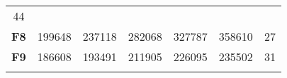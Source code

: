 \documentclass[12pt,a4paper]{article}
\begin{document}
\begin{longtable}[c]{@{}crrrrrr@{}}
\begin{minipage}[t]{0.07\columnwidth}\raggedleft\strut
44
\strut\end{minipage}\tabularnewline
\begin{minipage}[t]{0.11\columnwidth}\centering\strut
\textbf{F8}
\strut\end{minipage} &
\begin{minipage}[t]{0.08\columnwidth}\raggedleft\strut
199648
\strut\end{minipage} &
\begin{minipage}[t]{0.08\columnwidth}\raggedleft\strut
237118
\strut\end{minipage} &
\begin{minipage}[t]{0.09\columnwidth}\raggedleft\strut
282068
\strut\end{minipage} &
\begin{minipage}[t]{0.10\columnwidth}\raggedleft\strut
327787
\strut\end{minipage} &
\begin{minipage}[t]{0.11\columnwidth}\raggedleft\strut
358610
\strut\end{minipage} &
\begin{minipage}[t]{0.07\columnwidth}\raggedleft\strut
27
\strut\end{minipage}\tabularnewline
\begin{minipage}[t]{0.11\columnwidth}\centering\strut
\textbf{F9}
\strut\end{minipage} &
\begin{minipage}[t]{0.08\columnwidth}\raggedleft\strut
186608
\strut\end{minipage} &
\begin{minipage}[t]{0.08\columnwidth}\raggedleft\strut
193491
\strut\end{minipage} &
\begin{minipage}[t]{0.09\columnwidth}\raggedleft\strut
211905
\strut\end{minipage} &
\begin{minipage}[t]{0.10\columnwidth}\raggedleft\strut
226095
\strut\end{minipage} &
\begin{minipage}[t]{0.11\columnwidth}\raggedleft\strut
235502
\strut\end{minipage} &
\begin{minipage}[t]{0.07\columnwidth}\raggedleft\strut
31
\strut\end{minipage}\tabularnewline
\begin{minipage}[t]{0.11\columnwidth}\centering\strut

\end{minipage}
\end{longtable}
\end{document}
